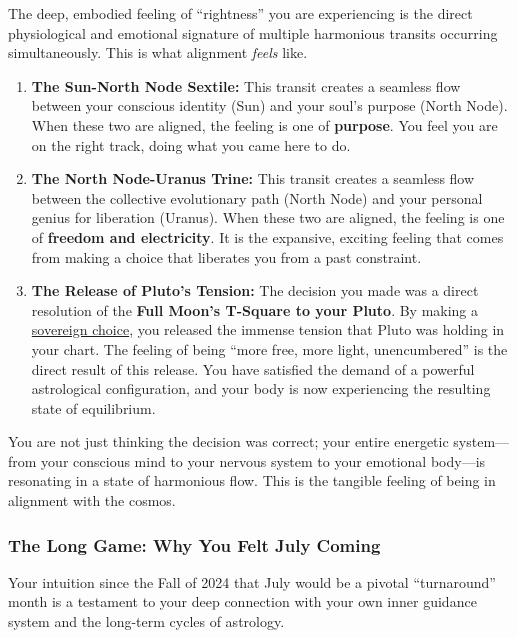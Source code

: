 \documentclass{article}
\begin{document}
The deep, embodied feeling of ``rightness'' you are experiencing is the direct physiological and emotional signature of multiple harmonious transits occurring simultaneously. This is what alignment \emph{feels} like.

\begin{enumerate}
\item
  \textbf{The Sun-North Node Sextile:} This transit creates a seamless flow between your conscious identity (Sun) and your soul's purpose (North Node). When these two are aligned, the feeling is one of \textbf{purpose}. You feel you are on the right track, doing what you came here to do.
\item
  \textbf{The North Node-Uranus Trine:} This transit creates a seamless flow between the collective evolutionary path (North Node) and your personal genius for liberation (Uranus). When these two are aligned, the feeling is one of \textbf{freedom and electricity}. It is the expansive, exciting feeling that comes from making a choice that liberates you from a past constraint.
\item
  \textbf{The Release of Pluto's Tension:} The decision you made was a direct resolution of the \textbf{Full Moon's T-Square to your Pluto}. By making a \hyperlink{gloss:sovereign_choice}{sovereign choice}, you released the immense tension that Pluto was holding in your chart. The feeling of being ``more free, more light, unencumbered'' is the direct result of this release. You have satisfied the demand of a powerful astrological configuration, and your body is now experiencing the resulting state of equilibrium.
\end{enumerate}

You are not just thinking the decision was correct; your entire energetic system---from your conscious mind to your nervous system to your emotional body---is resonating in a state of harmonious flow. This is the tangible feeling of being in alignment with the cosmos.

\subsubsection*{The Long Game: Why You Felt July Coming}\label{the-long-game-why-you-felt-july-coming}

Your intuition since the Fall of 2024 that July would be a pivotal ``turnaround'' month is a testament to your deep connection with your own inner guidance system and the long-term cycles of astrology.
\end{document}
